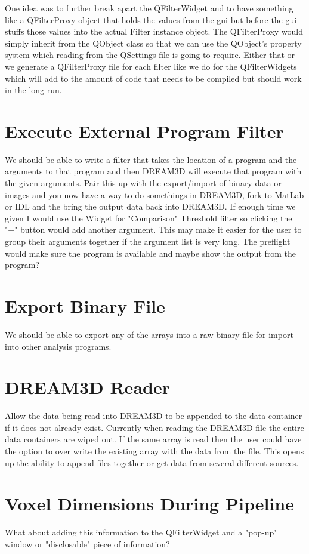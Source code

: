 \documentclass[12pt]{article} %
\begin{document}
  
 One idea was to further break apart the QFilterWidget and to have something like a QFilterProxy object that holds the values from the gui but before the gui stuffs those values into the actual Filter instance object. The QFilterProxy would simply inherit from the QObject class so that we can use the QObject's property system which reading from the QSettings file is going to require. Either that or we generate a QFilterProxy file for each filter like we do for the QFilterWidgets which will add to the amount of code that needs to be compiled but should work in the long run.


\section{Execute External Program Filter}
	We should be able to write a filter that takes the location of a program and the arguments to that program and then DREAM3D will execute that program with the given arguments. Pair this up with the export/import of binary data or images and you now have a way to do somethings in DREAM3D, fork to MatLab or IDL and the bring the output data back into DREAM3D. If enough time we given I would use the Widget for "Comparison" Threshold filter so clicking the "+" button would add another argument. This may make it easier for the user to group their arguments together if the argument list is very long. The preflight would make sure the program is available and maybe show the output from the program?

\section{Export Binary File}
  We should be able to export any of the arrays into a raw binary file for import into other analysis programs. 
  
\section{DREAM3D Reader}
 Allow the data being read into DREAM3D to be appended to the data container if it does not already exist. Currently when reading the DREAM3D file the entire data containers are wiped out. If the same array is read then the user could have the option to over write the existing array with the data from the file. This opens up the ability to append files together or get data from several different sources.   
   
\section{Voxel Dimensions During Pipeline}
What about adding this information to the QFilterWidget and a "pop-up" window or "disclosable" piece of information?
\end{document}
